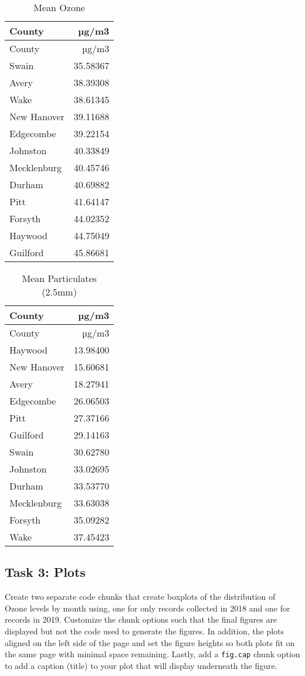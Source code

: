 \documentclass[
]{article}
\begin{document}
\begin{longtable}[]{@{}lr@{}}
\caption{Mean Ozone}\tabularnewline
\toprule()
County & µg/m3 \\
\midrule()
\endfirsthead
\toprule()
County & µg/m3 \\
\midrule()
\endhead
Swain & 35.58367 \\
Avery & 38.39308 \\
Wake & 38.61345 \\
New Hanover & 39.11688 \\
Edgecombe & 39.22154 \\
Johnston & 40.33849 \\
Mecklenburg & 40.45746 \\
Durham & 40.69882 \\
Pitt & 41.64147 \\
Forsyth & 44.02352 \\
Haywood & 44.75049 \\
Guilford & 45.86681 \\
\bottomrule()
\end{longtable}

\begin{longtable}[]{@{}lr@{}}
\caption{Mean Particulates (2.5mm)}\tabularnewline
\toprule()
County & µg/m3 \\
\midrule()
\endfirsthead
\toprule()
County & µg/m3 \\
\midrule()
\endhead
Haywood & 13.98400 \\
New Hanover & 15.60681 \\
Avery & 18.27941 \\
Edgecombe & 26.06503 \\
Pitt & 27.37166 \\
Guilford & 29.14163 \\
Swain & 30.62780 \\
Johnston & 33.02695 \\
Durham & 33.53770 \\
Mecklenburg & 33.63038 \\
Forsyth & 35.09282 \\
Wake & 37.45423 \\
\bottomrule()
\end{longtable}

\hypertarget{task-3-plots}{%
\subsection{Task 3: Plots}\label{task-3-plots}}

Create two separate code chunks that create boxplots of the distribution
of Ozone levels by month using, one for only records collected in 2018
and one for records in 2019. Customize the chunk options such that the
final figures are displayed but not the code used to generate the
figures. In addition, the plots aligned on the left side of the page and
set the figure heights so both plots fit on the same page with minimal
space remaining. Lastly, add a \texttt{fig.cap} chunk option to add a
caption (title) to your plot that will display underneath the figure.
\end{document}
